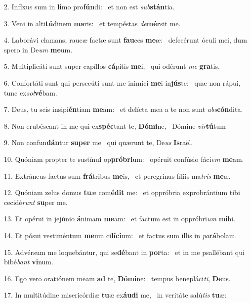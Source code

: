 2. Infíxus sum in \textbf{li}mo pro\textbf{fún}di: \ast\  et non est \textit{sub}\textbf{stán}tia.\

3. Veni in alti\textbf{tú}dinem \textbf{ma}ris: \ast\  et tempéstas \textit{de}\textbf{mér}sit me.\

4. Laborávi clamans, raucæ factæ sunt \textbf{fau}ces \textbf{me}æ: \ast\  defecérunt óculi mei, dum spero in De\textit{um} \textbf{me}um.\

5. Multiplicáti sunt super capíllos \textbf{cá}pitis \textbf{me}i, \ast\  qui odérunt \textit{me} \textbf{gra}tis.\

6. Confortáti sunt qui persecúti sunt me inimíci \textbf{me}i in\textbf{jús}te: \ast\  quæ non rápui, tunc ex\textit{sol}\textbf{vé}bam.\

7. Deus, tu scis insipi\textbf{én}tiam \textbf{me}am: \ast\  et delícta mea a te non sunt \textit{abs}\textbf{cón}dita.\

8. Non erubéscant in me qui ex\textbf{spéc}tant te, \textbf{Dó}\textbf{mi}ne, \ast\  Dómine \textit{vir}\textbf{tú}tum\

9. Non confun\textbf{dán}tur \textbf{su}\textbf{per} me \ast\  qui quærunt te, De\textit{us} \textbf{Is}raël.\

10. Quóniam propter te sustínu\textbf{i} op\textbf{pró}\textbf{bri}um: \ast\  opéruit confúsio fáci\textit{em} \textbf{me}am.\

11. Extráneus factus sum \textbf{frá}tribus \textbf{me}is, \ast\  et peregrínus fíliis ma\textit{tris} \textbf{me}æ.\

12. Quóniam zelus domus \textbf{tu}æ com\textbf{é}\textbf{dit} me: \ast\  et oppróbria exprobrántium tibi cecidé\textit{runt} \textbf{su}per me.\

13. Et opérui in jejúnio \textbf{á}nimam \textbf{me}am: \ast\  et factum est in oppróbri\textit{um} \textbf{mi}hi.\

14. Et pósui vestiméntum \textbf{me}um ci\textbf{lí}\textbf{ci}um: \ast\  et factus sum illis in \textit{pa}\textbf{rá}bolam.\

15. Advérsum me loquebántur, qui se\textbf{dé}bant in \textbf{por}ta: \ast\  et in me psallébant qui bibé\textit{bant} \textbf{vi}num.\

16. Ego vero oratiónem meam \textbf{ad} te, \textbf{Dó}\textbf{mi}ne: \ast\  tempus benepláci\textit{ti}, \textbf{De}us.\

17. In multitúdine misericórdiæ \textbf{tu}æ ex\textbf{áu}\textbf{di} me, \ast\  in veritáte salú\textit{tis} \textbf{tu}æ:\

